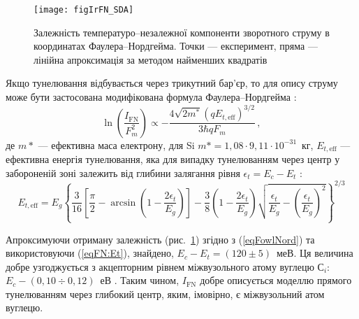 \begin{figure}
\center
\texttt{[image: figIrFN\_SDA]}
\caption{\label{figIrFN_SDA}
Залежність температуро--незалежної компоненти зворотного струму
в координатах Фаулера--Нордгейма.
Точки --- експеримент, пряма --- лінійна апроксимація за методом найменших квадратів
}%
\end{figure}

Якщо тунелювання відбувається через трикутний бар'єр, то для опису струму може бути застосована
модифікована формула Фаулера--Нордгейма  \cite{Rhoderick1988,Novikov,Kurnosova}:
\begin{equation}\label{eqFowlNord}
    \ln\left(\frac{I_\mathrm{FN}}{F_m^2}\right)\propto -\frac{4 \sqrt{2m^*}(qE_{t,\mathrm{eff}})^{3/2}}{3\hbar q F_m}\,,
\end{equation}
де
$m*$ ---  ефективна маса електрону,
для Si $m* = 1,08\cdot9,11\cdot10^{-31}$~кг,
$E_{t,\mathrm{eff}}$ --- ефективна енергія тунелювання,
яка для випадку тунелюванням через центр у забороненій зоні залежить від глибини залягання рівня $\epsilon_t=E_c-E_t$ \cite{Kurnosova,Bulyarskii2001r}:
\begin{equation}\label{eqFN:Et}
    E_{t,\mathrm{eff}}=E_g\left\{\frac{3}{16}\left[\frac{\pi}{2}-
     \arcsin\left(1-\frac{2\epsilon_t}{E_g}\right)\right]-\frac{3}{8}\left(1-\frac{2\epsilon_t}{E_g}\right)
     \sqrt{\frac{\epsilon_t}{E_g}-\left(\frac{\epsilon_t}{E_g}\right)^2}\right\}^{2/3}
\end{equation}


Апроксимуючи отриману залежність (рис.~\ref{figIrFN_SDA}) згідно з (\ref{eqFowlNord}) та використовуючи (\ref{eqFN:Et}),
знайдено, $E_c-E_t=(120\pm5)$~меВ.
Ця величина добре узгоджується з акцепторним рівнем міжвузольного атому вуглецю С$_i$: $E_c-(0,10\div0,12)$~еВ \cite{Vavilov1990r,Song1987}.
Таким чином, $I_\mathrm{FN}$ добре описується моделлю прямого тунелюванням через глибокий центр, яким, імовірно, є міжвузольний атом вуглецю.

